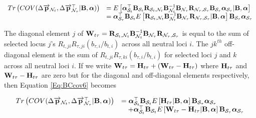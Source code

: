 \documentclass[12pt]{article}
\begin{document}
\begin{bibunit}
\begin{footnotesize}
\begin{equation}
\begin{array}{rl}
Tr\left(COV(\Delta \overrightarrow{\bf p}_{{\mathcal N}_t}, \Delta \overrightarrow{\bf p}_{{\mathcal N}_{\tau}}^\top  | {\bf B}, \boldsymbol{\alpha})\right)&=
E\left[\boldsymbol{\alpha}_{{\mathcal S}_{t}}^{\top}{\bf B}_{{\mathcal S}_t}{\bf R}_{{\mathcal S}_t, {\mathcal N}_t}{\bf B}_{{\mathcal N}_t}^{-1}{\bf B}_{{\mathcal N}_{\tau}}{\bf R}_{{\mathcal N}_\tau, {\mathcal S}_{\tau}}{\bf B}_{{\mathcal S}_{\tau}}\boldsymbol{\alpha}_{{\mathcal S}_{\tau}} | {\bf B}, \boldsymbol{\alpha}\right]\\
&=
\boldsymbol{\alpha}_{{\mathcal S}_{\tau}}^{\top}{\bf B}_{{\mathcal S}_t}E\left[{\bf R}_{{\mathcal S}_t, {\mathcal N}_t}{\bf B}_{{\mathcal N}_t}^{-1}{\bf B}_{{\mathcal N}_{\tau}}{\bf R}_{{\mathcal N}_\tau, {\mathcal S}_{\tau}} | {\bf B}, \boldsymbol{\alpha}\right]{\bf B}_{{\mathcal S}_{\tau}}\boldsymbol{\alpha}_{{\mathcal S}_{\tau}}\\
\end{array}
\label{Eq:BCcov6}
\end{equation}
\end{footnotesize}

The diagonal element $j$ of ${\bf W}_{t\tau}={\bf R}_{{\mathcal S}_t, {\mathcal N}_t}{\bf B}_{{\mathcal N}_t}^{-1}{\bf B}_{{\mathcal N}_{\tau}}{\bf R}_{{\mathcal N}_\tau, {\mathcal S}_{\tau}}$ is equal to the sum of selected locus $j$'s $R_{t,ji}R_{{\tau},ji}(b_{\tau,i}/b_{t,i})$ across all neutral loci $i$. The $jk^{th}$ off-diagonal element is the sum of $R_{t,ji}R_{{\tau},ki}(b_{\tau,i}/b_{t,i})$ for selected loci $j$ and $k$ across all neutral loci $i$. If we write  ${\bf W}_{t\tau} = {\bf H}_{t\tau}+({\bf W}_{t\tau}-{\bf H}_{t\tau})$ where ${\bf H}_{t\tau}$ and ${\bf W}_{t\tau}-{\bf H}_{t\tau}$ are zero but for the diagonal and off-diagonal elements respectively, then Equation \ref{Eq:BCcov6} becomes


\begin{equation}
\begin{array}{rl}
Tr\left(COV(\Delta \overrightarrow{\bf p}_{{\mathcal N}_t}, \Delta \overrightarrow{\bf p}_{{\mathcal N}_{\tau}}^\top | {\bf B}, \boldsymbol{\alpha})\right)&=
\boldsymbol{\alpha}_{{\mathcal S}_t}^{\top}{\bf B}_{{\mathcal S}_t}E\left[{\bf H}_{t\tau} | {\bf B}, \boldsymbol{\alpha}\right]{\bf B}_{{\mathcal S}_{\tau}}\boldsymbol{\alpha}_{{\mathcal S}_{\tau}}\\
&\quad+\boldsymbol{\alpha}_{{\mathcal S}_{t}}^{\top}{\bf B}_{{\mathcal S}_t}E\left[{\bf W}_{t\tau}-{\bf H}_{t\tau} | {\bf B}, \boldsymbol{\alpha}\right]{\bf B}_{{\mathcal S}_{\tau}}\boldsymbol{\alpha}_{{\mathcal S}_{\tau}}\\
\end{array}
\label{Eq:BCcov7}
\end{equation}


\end{bibunit}
\end{document}
